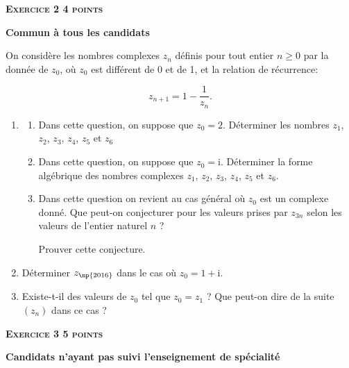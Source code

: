 \documentclass[a4paper,10pt]{article}
\begin{document}
\newpage
\textbf{\textsc{Exercice 2 \hfill 4 points}}

\textbf{Commun à tous les candidats} 

\medskip

On considère les nombres complexes $z_n$ définis pour tout entier $n \geqslant 0$ par la donnée de $z_0$, où $z_0$ est différent de 0 et de 1, et la relation de récurrence:

\[z_{n+1} = 1- \dfrac{1}{z_n}.\]

\begin{enumerate}
\item 
	\begin{enumerate}
		\item Dans cette question, on suppose que $z_0 = 2$. Déterminer les nombres $z_1$, $z_2$, $z_3$,  $z_4$,  $z_5$ et $z_6$
		\item Dans cette question, on suppose que $z_0 = \text{i}$. Déterminer la forme algébrique des nombres complexes $z_1$, $z_2$, $z_3$,  $z_4$,  $z_5$ et $z_6$.
\item Dans cette question on revient au cas général où $z_0$ est un complexe donné. Que peut-on conjecturer pour les valeurs prises par $z_{3n}$ selon les valeurs de l'entier naturel $n$ ?

Prouver cette conjecture.
	\end{enumerate}
\item Déterminer $z_{\np{2016}}$ dans le cas où $z_0 = 1 + \text{i}$.
\item Existe-t-il des valeurs de $z_0$ tel que $z_0 = z_1$ ? Que peut-on dire de la suite $\left(z_n\right)$ dans ce cas ?
\end{enumerate}
\vspace{0,5cm}
\textbf{\textsc{Exercice 3 \hfill 5 points}}

\textbf{Candidats n'ayant pas suivi l'enseignement de spécialité}
\end{document}
